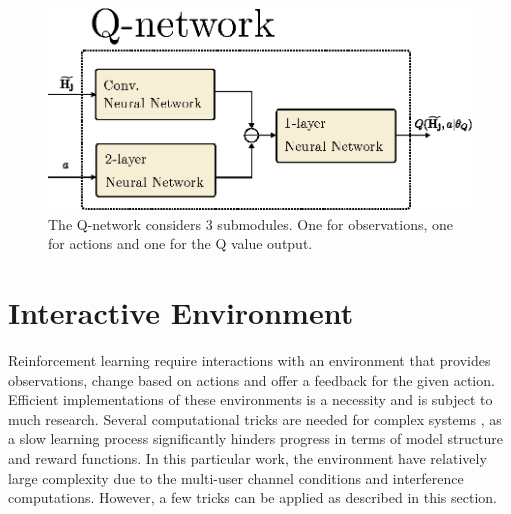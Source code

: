 \begin{figure}
    \centering
    \includegraphics{chapters/part_uplink/figures/RL_Q_network.eps}
    \caption{The Q-network considers 3 submodules. One for observations, one for actions and one for the Q value output.}
    \label{fig:rl_q_network}
\end{figure}


\section{Interactive Environment}\label{sec:interactive_environment}
Reinforcement learning require interactions with an environment that provides observations, change based on actions and offer a feedback for the given action. Efficient implementations of these environments is a necessity and is subject to much research. Several computational tricks are needed for complex systems \cite{Hafner2017TensorFlowTensorFlow}, as a slow learning process significantly hinders progress in terms of model structure and reward functions. In this particular work, the environment have relatively large complexity due to the multi-user channel conditions and interference computations. However, a few tricks can be applied as described in this section.

